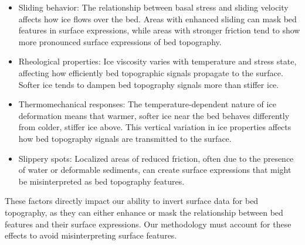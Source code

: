 \begin{itemize}
    \item Sliding behavior: The relationship between basal stress and sliding velocity affects how ice flows over the bed. Areas with enhanced sliding can mask bed features in surface expressions, while areas with stronger friction tend to show more pronounced surface expressions of bed topography.
    
    \item Rheological properties: Ice viscosity varies with temperature and stress state, affecting how efficiently bed topographic signals propagate to the surface. Softer ice tends to dampen bed topography signals more than stiffer ice.
    
    \item Thermomechanical responses: The temperature-dependent nature of ice deformation means that warmer, softer ice near the bed behaves differently from colder, stiffer ice above. This vertical variation in ice properties affects how bed topography signals are transmitted to the surface.
    
    \item Slippery spots: Localized areas of reduced friction, often due to the presence of water or deformable sediments, can create surface expressions that might be misinterpreted as bed topography features.
\end{itemize}

These factors directly impact our ability to invert surface data for bed topography, as they can either enhance or mask the relationship between bed features and their surface expressions. Our methodology must account for these effects to avoid misinterpreting surface features.


